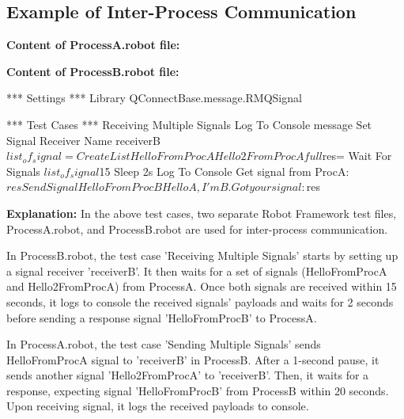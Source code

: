 \newpage

\subsection{Example of Inter-Process Communication}

\textbf{Content of ProcessA.robot file:}

\textbf{Content of ProcessB.robot file:}
\begin{robotcode}
*** Settings ***
Library        QConnectBase.message.RMQSignal

*** Test Cases ***
Receiving Multiple Signals
   Log To Console    message
   Set Signal Receiver Name    receiverB
   ${list_of_signal} =    Create List    HelloFromProcA    Hello2FromProcAfull
   ${res}=    Wait For Signals    ${list_of_signal}    ${15}
   Sleep    2s
   Log To Console    Get signal from ProcA: ${res}
   Send Signal    HelloFromProcB      Hello A, I'm B. Got your signal:${res}
\end{robotcode}

\textbf{Explanation:}
In the above test cases, two separate Robot Framework test files, ProcessA.robot, and ProcessB.robot are used for inter-process communication.

In ProcessB.robot, the test case 'Receiving Multiple Signals' starts by setting up a signal receiver 'receiverB'. It then waits for a set of signals (HelloFromProcA and Hello2FromProcA) from ProcessA. Once both signals are received within 15 seconds, it logs to console the received signals' payloads and waits for 2 seconds before sending a response signal 'HelloFromProcB' to ProcessA.

In ProcessA.robot, the test case 'Sending Multiple Signals' sends HelloFromProcA signal to 'receiverB' in ProcessB. After a 1-second pause, it sends another signal 'Hello2FromProcA' to 'receiverB'. Then, it waits for a response, expecting signal 'HelloFromProcB' from ProcessB within 20 seconds. Upon receiving signal, it logs the received payloads to console.



